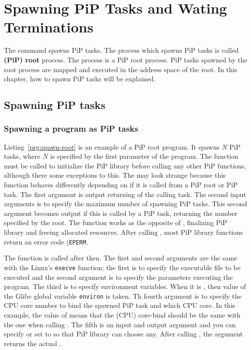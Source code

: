 
\section{Spawning PiP Tasks and Wating Terminations}

The  command spawns PiP tasks. The
process which spawns PiP tasks is called {\bf (PiP) root} process. The
 process is a PiP root process. 
PiP tasks spawned by the root process are mapped and executed in the
address space of the root. In this chapter, how to spawn PiP tasks
will be explained.

\subsection{Spawning PiP tasks}

\subsubsection{Spawning a program as PiP tasks}

Listing~\ref{prg:spawn-root} is an example of a PiP root program. It
spawns $N$ PiP tasks, where $N$ is specified by the first parameter
of the program. The  function must be called to
initialize the PiP library before calling any other PiP functions,
although there some exceptions to this. The  may
look strange because this function behaves differently depending
on if it is called from a PiP root or PiP task. The first argument is
output returning {\PIPID} of the calling task. The second input
arguments is to specify the maximum number of spawning PiP tasks. This
second argument becomes output if this is called by a PiP task,
returning the number specified by the root.
The  function works as the opposite of
, finalizing PiP library and freeing allocated 
resources. After calling , most PiP library
functions return an error code ({\tt EPERM}.

The  function is called after then. The first and
second arguments are the same with the Linux's {\tt execve}
function; the first is to specify the executable file to be executed
and the second argument is to specify the parameters executing the
program. The third is to specify environment variables. When it is
{\NULL}, then value of the Glibc global variable {\tt environ} is
taken. Th fourth argument is to specify the CPU core number to bind
the spawned PiP task and which CPU core. In this example, the value of
 means that the (CPU) core-bind should be
the same with the one when calling . The fifth
is an input and output argument and you can specify {\PIPID} or
set to  so that PiP library can choose
any. After calling , the argument returns the
actual {\PIPID}. 

